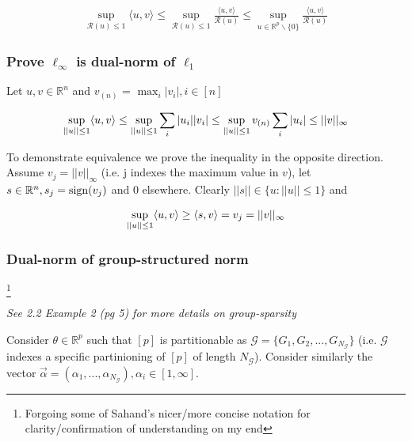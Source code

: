 \documentclass[11pt]{article}
\begin{document}
\begin{gather*}
 	\sup_{\mathcal{R}(u)\leq 1} \langle u,v \rangle 
	\leq 
	\sup_{\mathcal{R}(u)\leq 1}\frac{\langle u,v \rangle}{\mathcal{R}(u)}
	\leq 
	\sup_{u \in \mathbb{R}^p\backslash\{0\} } \frac{\langle u, v \rangle}{\mathcal{R}(u)}
\end{gather*}


\subsubsection{Prove $\ell_\infty$ is dual-norm of $\ell_1$}

Let $u,v \in \mathbb{R}^n$ and $v_{(n)}$ = $\max_i |v_i|, i \in [n]$

\begin{gather*}
    \sup_{||u||\leq 1} \langle u,v\rangle
    \leq 
    \sup_{||u||\leq 1} \sum_i |u_i||v_i|
    \leq 
    \sup_{||u|| \leq 1}  v_{(n)} \sum_i |u_i|
    \leq 
    ||v||_\infty 
\end{gather*}

To demonstrate equivalence we prove the inequality in the opposite direction. Assume $v_j = ||v||_\infty$ (i.e. j indexes the maximum value in $v$), let $s \in \mathbb{R}^n, s_j = \operatorname{sign}(v_j)$ and $0$ elsewhere. Clearly $||s|| \in \{u: ||u||\leq 1\}$ and 

\begin{gather*}
    \sup_{||u||\leq 1} \langle u, v\rangle
    \geq 
    \langle s, v\rangle
    =
    v_j 
    =
    ||v||_\infty
\end{gather*}

\subsubsection{Dual-norm of group-structured norm}
    \footnote{Forgoing some of Sahand's nicer/more concise notation for clarity/confirmation of understanding on my end}

{\it See 2.2 Example 2 (pg 5) for more details on group-sparsity} \newline 

Consider $\theta \in \mathbb{R}^p$ such that  $[p]$ is partitionable as $\mathcal{G} = \{G_1, G_2, ..., G_{N_\mathcal{G}}\}$ (i.e. $\mathcal{G}$ indexes a specific partinioning of $[p]$ of length $N_{\mathcal{G}}$).
Consider similarly the vector $\overrightarrow{\alpha} = (\alpha_1, ..., \alpha_{N_\mathcal{G}}), \alpha_i \in [1, \infty]$. 
\end{document}
